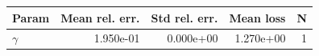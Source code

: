 \begin{tabular}{lrrrr}
\hline
Param & Mean rel. err. & Std rel. err. & Mean loss & N \\
\hline
$\gamma$ & 1.950e-01 & 0.000e+00 & 1.270e+00 & 1 \\
\hline
\end{tabular}

